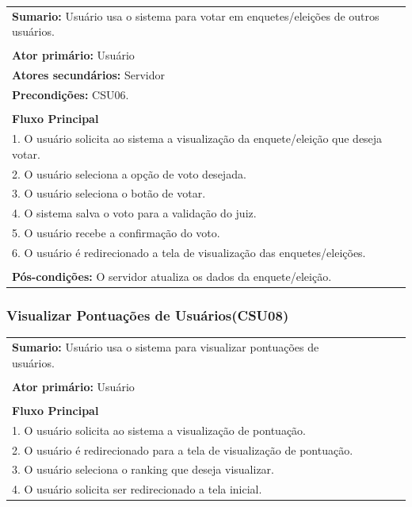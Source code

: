 \documentclass[a4paper,12pt]{article}
\begin{document}
\begin{tabular}{|l|}\hline
	{\textbf{Sumario:}} Usuário usa o sistema para votar em enquetes/eleições de outros usuários.\ \ \ \ \ \ \ \ \ \ \ \ \ \\\\
	{\textbf{Ator primário:}} Usuário \\
	{\textbf{Atores secundários:}} Servidor\\
	{\textbf{Precondições:}} CSU06.\\\\
	{\textbf{Fluxo Principal}}\\
	1. O usuário solicita ao sistema a visualização da enquete/eleição que deseja votar.\\
	2. O usuário seleciona a opção de voto desejada.\\
	3. O usuário seleciona o botão de votar.\\
	4. O sistema salva o voto para a validação do juiz.\\
	5. O usuário recebe a confirmação do voto.\\
	6. O usuário é redirecionado a tela de visualização das enquetes/eleições.\\\\
	{\textbf{Pós-condições:}} O servidor atualiza os dados da enquete/eleição.\\
	\hline
\end{tabular}

\begin{center}
	{\subsubsection*{Visualizar Pontuações de Usuários(CSU08)}}
\end{center}
\markright{}
\begin{tabular}{|l|}\hline
	{\textbf{Sumario:}} Usuário usa o sistema para visualizar pontuações de usuários.\ \ \ \ \ \ \ \ \ \ \ \ \ \ \ \ \ \ \ \ \ \ \ \ \ \ \ \ \ \ \ \ \ \\\\
	{\textbf{Ator primário:}} Usuário \\\\
	{\textbf{Fluxo Principal}}\\
	1. O usuário solicita ao sistema a visualização de pontuação.\\
	2. O usuário é redirecionado para a tela de visualização de pontuação. \\
	3. O usuário seleciona o ranking que deseja visualizar. \\
	4. O usuário solicita ser redirecionado a tela inicial.\\
	\hline
\end{tabular}
\end{document}
